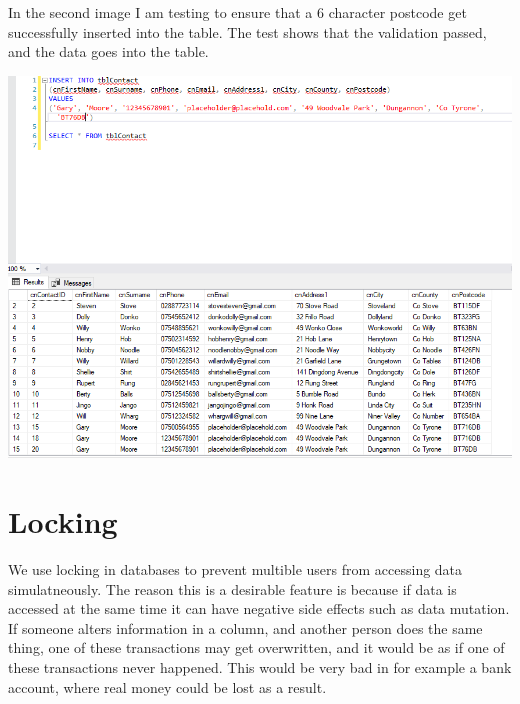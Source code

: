 \documentclass[11pt,a4paper]{scrartcl}
\begin{document}
	In the second image I am testing to ensure that a 6 character postcode get successfully inserted into the table. The test shows that the validation passed, and the data goes into the table.
	
	\begin{center}
		\includegraphics[width=0.9\linewidth]{images/PostcodeConstraintTest2}
	\end{center}
	
	\section{Locking}\label{locking}
	
	We use locking in databases to prevent multible users from accessing data simulatneously. The reason this is a desirable feature is because if data is accessed at the same time it can have negative side effects such as data mutation. If someone alters information in a column, and another person does the same thing, one of these transactions may get overwritten, and it would be as if one of these transactions never happened. This would be very bad in for example a bank account, where real money could be lost as a result.
\end{document}
